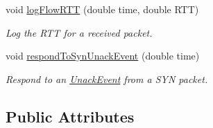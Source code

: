 \begin{DoxyCompactItemize}
void \hyperlink{classFlow_a04338dbf3a16eeedeef168c9ee8ee6a6}{log\-Flow\-R\-T\-T} (double time, double \-R\-T\-T)
\begin{DoxyCompactList}\small\item\em \-Log the \-R\-T\-T for a received packet. \end{DoxyCompactList}\item 
void \hyperlink{classFlow_a969e962a3ed0349fbb45af508f923069}{respond\-To\-Syn\-Unack\-Event} (double time)
\begin{DoxyCompactList}\small\item\em \-Respond to an \hyperlink{classUnackEvent}{\-Unack\-Event} from a \-S\-Y\-N packet. \end{DoxyCompactList}\end{DoxyCompactItemize}
\subsection*{\-Public \-Attributes}
